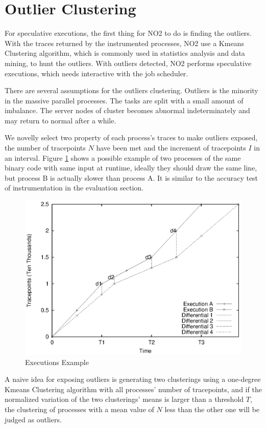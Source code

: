 \section{Outlier Clustering}

For speculative executions, the first thing for NO2 to do is finding the outliers. With the traces returned by the instrumented processes, NO2 use a Kmeans Clustering algorithm, which is commonly used in statistics analysis and data mining, to hunt the outliers. With outliers detected, NO2 performs speculative executions, which needs interactive with the job scheduler.

There are several assumptions for the outliers clustering. Outliers is the minority in the massive parallel processes. The tasks are split with a small amount of imbalance. The server nodes of cluster becomes abnormal indeterminately and may return to normal after a while.

We novelly select two property of each process's traces to make outliers exposed, the number of tracepoints $N$ have been met and the increment of tracepoints $I$ in an interval. Figure \ref{figure:executionsexample} shows a possible example of two processes of the same binary code with same input at runtime, ideally they should draw the same line, but process B is actually slower than process A. It is similar to the accuracy test of instrumentation in the evaluation section.

\begin{figure}
\centering
\includegraphics[width=0.9\columnwidth]{figures/executions_example.eps}
\caption{Executions Example}
\label{figure:executionsexample}
\end{figure}

A naive idea for exposing outliers is generating two clusterings using a one-degree Kmeans Clustering algorithm with all processes' number of tracepoints, and if the normalized variation of the two clusterings' means is larger than a threshold $T$, the clustering of processes with a mean value of $N$ less than the other one will be judged as outliers.

